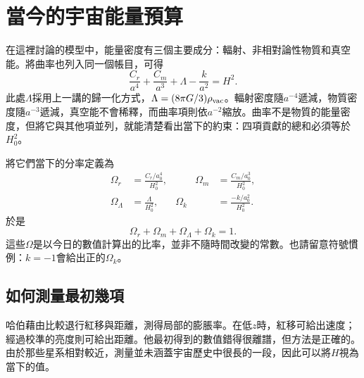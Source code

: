 \section{當今的宇宙能量預算}

在這裡討論的模型中，能量密度有三個主要成分：輻射、非相對論性物質和真空能。將曲率也列入同一個帳目，可得
\begin{equation}
\frac{C_r}{a^4}
+\frac{C_m}{a^3}
+\Lambda
-\frac{k}{a^2}
=H^2.
\label{eq:c06-budget}
\end{equation}
此處\(\Lambda\)採用上一講的歸一化方式，\(\Lambda=(8\pi G/3)\rho_{\rm vac}\)。輻射密度隨\(a^{-4}\)遞減，物質密度隨\(a^{-3}\)遞減，真空能不會稀釋，而曲率項則依\(a^{-2}\)縮放。曲率不是物質的能量密度，但將它與其他項並列，就能清楚看出當下的約束：四項貢獻的總和必須等於\(H_0^2\)。

將它們當下的分率定義為
\begin{equation}
\begin{aligned}
\Omega_r&=\frac{C_r/a_0^4}{H_0^2},
&\qquad
\Omega_m&=\frac{C_m/a_0^3}{H_0^2},\\
\Omega_\Lambda&=\frac{\Lambda}{H_0^2},
&
\Omega_k&=\frac{-k/a_0^2}{H_0^2}.
\end{aligned}
\label{eq:c06-omegas}
\end{equation}
於是
\begin{equation}
\boxed{\Omega_r+\Omega_m+\Omega_\Lambda+\Omega_k=1.}
\label{eq:c06-sum-rule}
\end{equation}
這些\(\Omega\)是以今日的數值計算出的比率，並非不隨時間改變的常數。也請留意符號慣例：\(k=-1\)會給出正的\(\Omega_k\)。

\subsection{如何測量最初幾項}

哈伯藉由比較退行紅移與距離，測得局部的膨脹率。在低\(z\)時，紅移可給出速度；經過校準的亮度則可給出距離。他最初得到的數值錯得很離譜，但方法是正確的。由於那些星系相對較近，測量並未涵蓋宇宙歷史中很長的一段，因此可以將\(H\)視為當下的值。

\begin{classroomqa}
\end{classroomqa}


